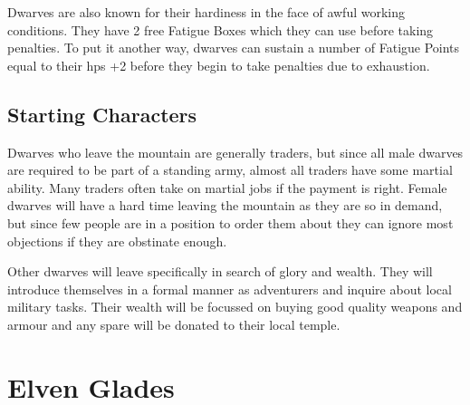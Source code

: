 \begin{multicols}{2}
Dwarves are also known for their hardiness in the face of awful working conditions. They have 2 free Fatigue Boxes which they can use before taking penalties. To put it another way, dwarves can sustain a number of Fatigue Points equal to their \glspl{hp} +2 before they begin to take penalties due to exhaustion.

\subsection{Starting Characters}

Dwarves who leave the mountain are generally traders, but since all male dwarves are required to be part of a standing army, almost all traders have some martial ability. Many traders often take on martial jobs if the payment is right. Female dwarves will have a hard time leaving the mountain as they are so in demand, but since few people are in a position to order them about they can ignore most objections if they are obstinate enough.

Other dwarves will leave specifically in search of glory and wealth. They will introduce themselves in a formal manner as adventurers and inquire about local military tasks. Their wealth will be focussed on buying good quality weapons and armour and any spare will be donated to their local temple.

\end{multicols}

\section[Elves]{Elven Glades}

